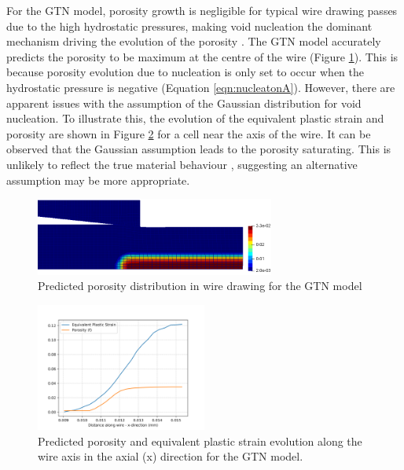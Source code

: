 \documentclass[sn-mathphys,Numbered]{sn-jnl}%
\begin{document}
For the GTN model, porosity growth is negligible for typical wire drawing passes due to the high hydrostatic pressures, making void nucleation the dominant mechanism driving the evolution of the porosity \cite{cao_modelling_2014}.
The GTN model accurately predicts the porosity to be maximum at the centre of the wire (Figure \ref{fig:GTN_wire_draw_poro}).
This is because porosity evolution due to nucleation is only set to occur when the hydrostatic pressure is negative (Equation \ref{eqn:nucleatonA}).
However, there are apparent issues with the assumption of the Gaussian distribution for void nucleation.
To illustrate this, the evolution of the equivalent plastic strain and porosity are shown in Figure \ref{fig:GTN_wire_draw_plot} for a cell near the axis of the wire.
It can be observed that the Gaussian assumption leads to the porosity saturating.
This is unlikely to reflect the true material behaviour \cite{cao_modelling_2014}, suggesting an alternative assumption may be more appropriate.
\begin{figure}[htb]
\begin{center}
	\includegraphics[width=0.7\textwidth]{./Figures/SimulationAndAnalysis/modelCompare/gtnModel2.png}
	\caption{Predicted porosity distribution in wire drawing for the GTN model}
	\label{fig:GTN_wire_draw_poro}
\end{center}
\end{figure}
\begin{figure}[htb]
\begin{center}
	\includegraphics[width=0.5\textwidth]{./Figures/SimulationAndAnalysis/modelCompare/GTNElement.png}
	\caption{Predicted porosity and equivalent plastic strain evolution along the wire axis in the axial (x) direction for the GTN model.}
	\label{fig:GTN_wire_draw_plot}
\end{center}
\end{figure}
\end{document}
